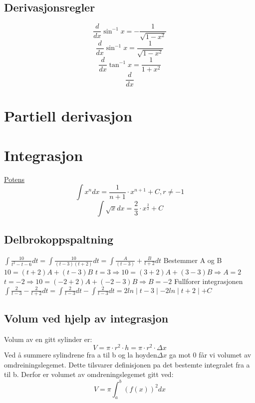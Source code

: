 \documentclass[12pt]{article}
\begin{document}
\subsection*{Derivasjonsregler}
\[\frac{d}{dx}\sin^{-1}x=-\frac{1}{\sqrt{1-x^2}}\]
\[\frac{d}{dx}\sin^{-1}x=\frac{1}{\sqrt{1-x^2}}\]
\[\frac{d}{dx}\tan^{-1}x=\frac{1}{1+x^2}\]
\[\frac{d}{dx}\]


\newpage\section{Partiell derivasjon}


\newpage\section{Integrasjon}
\underline{Potens}
\[\int x^{n} dx = \frac{1}{n+1}\cdot x^{n+1} + C, r\neq -1\]
\[\int \sqrt{x} dx = \frac{2}{3} \cdot x^{\frac{3}{2}} + C\]
\[\]
\[\]
\subsection*{Delbrokoppspaltning}
$\int\frac{10}{t^2-t-6}dt=\int\frac{10}{(t-3)(t+2)}dt=\int\frac{A}{(t-3)}+\frac{B}{t+2}dt$
\newline Bestemmer A og B
\newline$10=(t+2)A+(t-3)B$
\newline$t=3\Rightarrow 10=(3+2)A+(3-3)B\Rightarrow A=2$
\newline$t=-2\Rightarrow 10=(-2+2)A+(-2-3)B\Rightarrow B=-2$
\newline Fullforer integrasjonen
\newline$\int\frac{2}{t-3}-\frac{2}{t+2}dt=\int\frac{2}{t-3}dt-\int\frac{2}{t-3}dt=2ln\mid t-3\mid-2ln\mid t+2\mid + C$
\subsection*{Volum ved hjelp av integrasjon}
Volum av en gitt sylinder er:
\[V=\pi\cdot r^{2}\cdot h=\pi\cdot r^{2}\cdot\Delta x\]
Ved å summere sylindrene fra a til b og la hoyden$\Delta x$ ga mot 0 får vi
\newline volumet av omdreiningslegemet.
\newline Dette tilsvarer definisjonen pa det bestemte integralet fra a til b.
\newline Derfor er volumet av omdreningslegemet gitt ved:
\[V=\pi\int_{a}^{b}(f(x))^{2}dx\]
\end{document}
